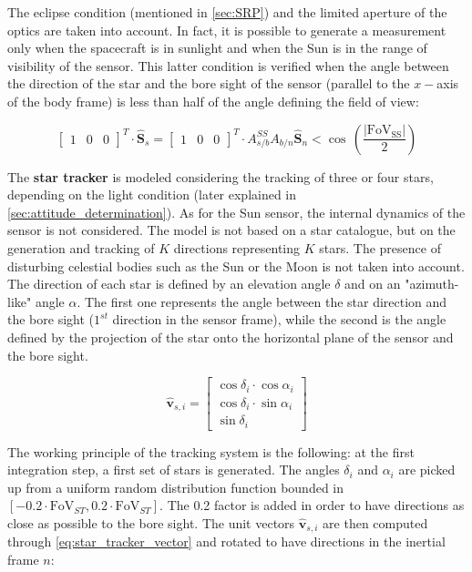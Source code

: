 The eclipse condition (mentioned in \cref{sec:SRP}) and the limited aperture of the optics are taken into account. In fact, it is possible to generate a measurement only when the spacecraft is in sunlight and when the Sun is in the range of visibility of the sensor. This latter condition is verified when the angle between the direction of the star and the bore sight of the sensor (parallel to the $x-$axis of the body frame) is less than half of the angle defining the field of view:

\begin{equation}
    \begin{bmatrix}
    1 & 0 & 0
    \end{bmatrix}^T \cdot \hat{\mathbf{S}}_s = \begin{bmatrix}
    1 & 0 & 0
    \end{bmatrix}^T \cdot A_{s/b}^{SS} A_{b/n} \hat{\mathbf{S}}_n < \cos\, \left( \frac{\mathrm{|FoV_{SS}|}}{2} \right)
\end{equation}

The \textbf{star tracker} is modeled considering the tracking of three or four stars, depending on the light condition (later explained in \cref{sec:attitude_determination}). As for the Sun sensor, the internal dynamics of the sensor is not considered. The model is not based on a star catalogue, but on the generation and tracking of $K$ directions representing $K$ stars. The presence of disturbing celestial bodies such as the Sun or the Moon is not taken into account. The direction of each star is defined by an elevation angle $\delta$ and on an "azimuth-like" angle $\alpha$. The first one represents the angle between the star direction and the bore sight ($1^{st}$ direction in the sensor frame), while the second is the angle defined by the projection of the star onto the horizontal plane of the sensor and the bore sight. 

\begin{equation}
    \hat{\mathbf{v}}_{s,i} = \begin{bmatrix}
    \cos \delta_i \cdot \cos \alpha_i \\
    \cos \delta_i \cdot \sin \alpha_i \\
    \sin \delta_i
    \end{bmatrix}
    \label{eq:star_tracker_vector}
\end{equation}

The working principle of the tracking system is the following: at the first integration step, a first set of stars is generated. The angles $\delta_i$ and $\alpha_i$ are picked up from a uniform random distribution function bounded in $[-0.2\cdot \mathrm{FoV}_{ST}, 0.2 \cdot \mathrm{FoV}_{ST}]$. The 0.2 factor is added in order to have directions as close as possible to the bore sight. The unit vectors $\hat{\mathbf{v}}_{s,i}$ are then computed through \cref{eq:star_tracker_vector} and rotated to have directions in the inertial frame $n$:

